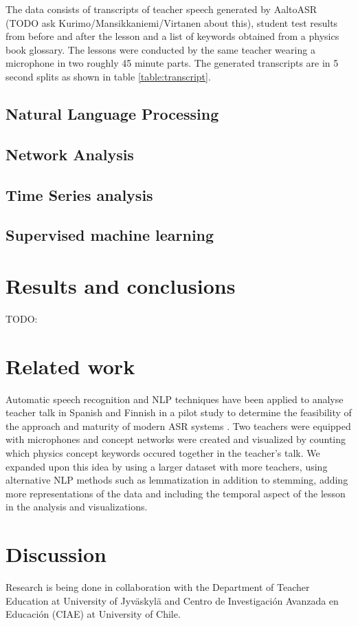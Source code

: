 \documentclass[utf8,english]{gradu3}
\begin{document}
The data consists of transcripts of teacher speech generated by AaltoASR (TODO ask Kurimo/Mansikkaniemi/Virtanen about this), student test results from before and after the lesson and a list of keywords obtained from a physics book glossary. The lessons were conducted by the same teacher wearing a microphone in two roughly 45 minute parts. The generated transcripts are in 5 second splits as shown in table \ref{table:transcript}.



\section{Natural Language Processing}

\section{Network Analysis}

\section{Time Series analysis}

\section{Supervised machine learning}



\chapter{Results and conclusions}

TODO:
\chapter{Related work}

Automatic speech recognition and NLP techniques have been applied to analyse teacher talk in Spanish and Finnish in a pilot study to determine the feasibility of the approach and maturity of modern ASR systems \parencite{caballeroASRClassroomToday2017}. Two teachers were equipped with microphones and concept networks were created and visualized by counting which physics concept keywords occured together in the teacher's talk. We expanded upon this idea by using a larger dataset with more teachers, using alternative NLP methods such as lemmatization in addition to stemming, adding more representations of the data and including the temporal aspect of the lesson in the analysis and visualizations.

\chapter{Discussion}

Research is being done in collaboration with the Department of Teacher Education at University of Jyväskylä and Centro de Investigación Avanzada en Educación (CIAE) at University of Chile.
 
\printbibliography
\end{document}
